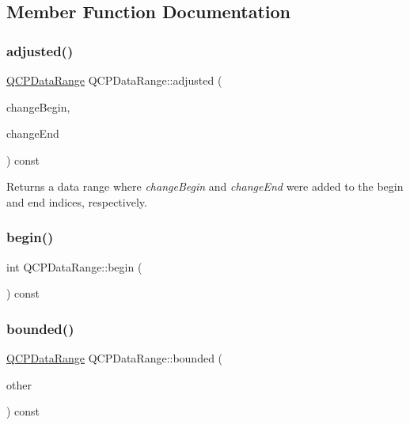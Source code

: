 \subsection{Member Function Documentation}
\mbox{\label{class_q_c_p_data_range_a279ed36602b39607699dc5652bcaf813}} 
\subsubsection{\texorpdfstring{adjusted()}{adjusted()}}
{\footnotesize\ttfamily \hyperlink{class_q_c_p_data_range}{Q\+C\+P\+Data\+Range} Q\+C\+P\+Data\+Range\+::adjusted (\begin{DoxyParamCaption}\item[{int}]{change\+Begin,  }\item[{int}]{change\+End }\end{DoxyParamCaption}) const\hspace{0.3cm}{\ttfamily [inline]}}

Returns a data range where {\itshape change\+Begin} and {\itshape change\+End} were added to the begin and end indices, respectively. \mbox{\label{class_q_c_p_data_range_ae76d7eba9defdfafcd0fc41096793129}} 
\subsubsection{\texorpdfstring{begin()}{begin()}}
{\footnotesize\ttfamily int Q\+C\+P\+Data\+Range\+::begin (\begin{DoxyParamCaption}{ }\end{DoxyParamCaption}) const\hspace{0.3cm}{\ttfamily [inline]}}

\mbox{\label{class_q_c_p_data_range_a93529421d12fdd3a8bdb2b8061936352}} 
\subsubsection{\texorpdfstring{bounded()}{bounded()}}
{\footnotesize\ttfamily \hyperlink{class_q_c_p_data_range}{Q\+C\+P\+Data\+Range} Q\+C\+P\+Data\+Range\+::bounded (\begin{DoxyParamCaption}\item[{const \hyperlink{class_q_c_p_data_range}{Q\+C\+P\+Data\+Range} \&}]{other }\end{DoxyParamCaption}) const}

